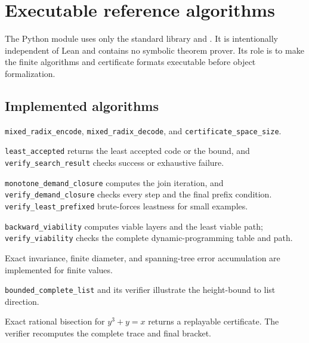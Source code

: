 \section{Executable reference algorithms}
\label{app:reference}

The Python module  uses only the standard library and .  It is intentionally independent of Lean and contains no symbolic theorem prover.  Its role is to make the finite algorithms and certificate formats executable before object formalization.

\subsection{Implemented algorithms}

\begin{description}[style=nextline,leftmargin=2.7em]
\item[Mixed-radix coding.] \texttt{mixed\_radix\_encode}, \texttt{mixed\_radix\_decode}, and \texttt{certificate\_space\_size}.

\item[Least accepted search.] \texttt{least\_accepted} returns the least accepted code or the bound, and \texttt{verify\_search\_result} checks success or exhaustive failure.

\item[Demand closure.] \texttt{monotone\_demand\_closure} computes the join iteration, and \texttt{verify\_demand\_closure} checks every step and the final prefix condition.  \texttt{verify\_least\_prefixed} brute-forces leastness for small examples.

\item[Backward viability.] \texttt{backward\_viability} computes viable layers and the least viable path; \texttt{verify\_viability} checks the complete dynamic-programming table and path.

\item[Observers.] Exact invariance, finite diameter, and spanning-tree error accumulation are implemented for finite values.

\item[Height enumeration.] \texttt{bounded\_complete\_list} and its verifier illustrate the height-bound to list direction.

\item[Cubic bisection.] Exact rational bisection for \(y^3+y=x\) returns a replayable certificate.  The verifier recomputes the complete trace and final bracket.
\end{description}

